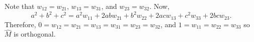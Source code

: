 \documentclass{ximera}
\begin{document}
\begin{problem}
\begin{freeResponse}
 Note that $w_{12} =  w_{21}$, $w_{13} =  w_{31}$, and $w_{23} =  w_{32}$. Now,
\[
 a^2 + b^2 +c^2 =  
a^2 w_{11} + 2abw_{21} + b^2 w_{22} + 2ac w_{13} + c^2 w_{33} + 2bc w_{23}.
\]
Therefore,  $0 = w_{12} =  w_{21} =w_{13} =  w_{31} = w_{23} =  w_{32}$, and $1 =  w_{11} =  w_{22} =  w_{33}$ so $\hat{M}$ is orthogonal. 
 
    
%    
%    
\end{freeResponse}

\end{problem}
\end{document}
